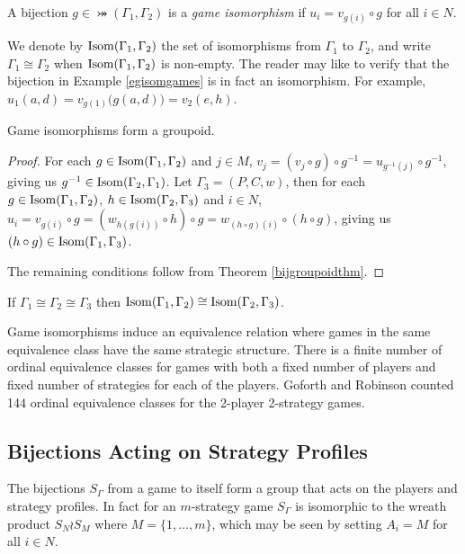 	\begin{definition}
		A bijection $g \in \bij(\Gamma_1, \Gamma_2)$ is a \textit{game isomorphism} if $u_i = v_{g(i)}\circ g$ for all $i \in N$. 
	\end{definition}

	We denote by $\operatorname*{Isom}(\Gamma_1, \Gamma_2)$ the set of isomorphisms from $\Gamma_1$ to $\Gamma_2$, and write $\Gamma_1 \cong \Gamma_2$ when $\operatorname*{Isom}(\Gamma_1, \Gamma_2)$ is non-empty. The reader may like to verify that the bijection in Example \ref{egisomgames} is in fact an isomorphism. For example, $u_1(a, d) = v_{g(1)}\bigl(g(a, d)\bigr) = v_2(e, h)$.
            
	\begin{theorem} 
		Game isomorphisms form a groupoid.
            
		\begin{proof}                
			For each $g \in \operatorname*{Isom}(\Gamma_1, \Gamma_2)$ and $j \in M$, $v_j = (v_j \circ g) \circ g^{-1} = u_{g^{-1}(j)} \circ g^{-1}$, giving us $g^{-1} \in \operatorname*{Isom}(\Gamma_2, \Gamma_1)$. Let $\Gamma_3 = (P, C, w)$, then for each $g \in \operatorname*{Isom}(\Gamma_1, \Gamma_2)$, $h \in \operatorname*{Isom}(\Gamma_2, \Gamma_3)$ and $i \in N$, $u_i = v_{g(i)} \circ g = (w_{h(g(i))} \circ h) \circ g = w_{(h \circ g)(i)} \circ (h \circ g)$, giving us $(h \circ g) \in \operatorname*{Isom}(\Gamma_1, \Gamma_3)$.
                  
			The remaining conditions follow from Theorem \ref{bijgroupoidthm}.
		\end{proof}
	\end{theorem}
        
	\begin{corollary} \label{isocorollary}
		If $\Gamma_1 \cong \Gamma_2 \cong \Gamma_3$ then $\operatorname*{Isom}(\Gamma_1, \Gamma_2) \cong \operatorname*{Isom}(\Gamma_2, \Gamma_3)$.
	\end{corollary}
        
	Game isomorphisms induce an equivalence relation where games in the same equivalence class have the same strategic structure. There is a finite number of ordinal equivalence classes for games with both a fixed number of players and fixed number of strategies for each of the players. Goforth and Robinson \cite{GoforthRobinson} counted 144 ordinal equivalence classes for the 2-player 2-strategy games.
        
\subsection{Bijections Acting on Strategy Profiles}
The bijections $S_{\Gamma}$ from a game to itself form a group that acts on the players and strategy profiles. In fact for an $m$-strategy game $S_{\Gamma}$ is isomorphic to the wreath product $S_N \wr S_M$ where $M = \{1, \ldots, m\}$, which may be seen by setting $A_i = M$ for all $i \in N$. 

